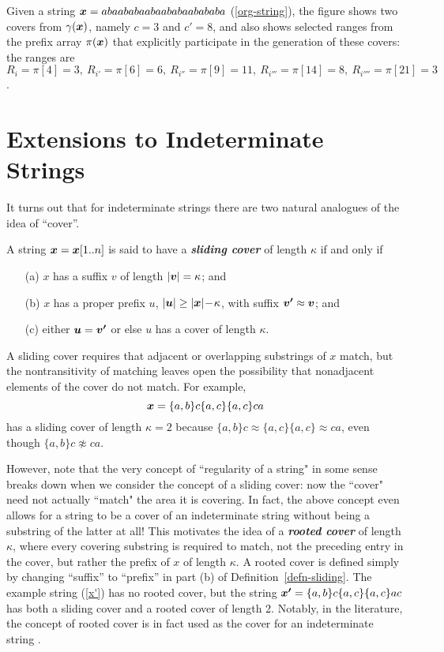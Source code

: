 \documentclass[runningheads,a4paper]{llncs}
\def\s#1{\mbox{\boldmath $#1$}}
\def\-{\!-\!}
\def\itbf#1{\textit{\textbf{#1}}}
\def\match{\approx}
\begin{document}
Given a string $\s{x}=abaababaabaababaabababa$ (\ref{org-string}),
the figure shows two covers from $\gamma(\s{x})$, namely $c=3$ and $c'=8$,
and also shows selected ranges from the prefix array $\pi(\s{x})$ that
explicitly participate in the generation of these covers: the ranges are $
R_{i} = \pi[4] = 3,~ R_{i'}= \pi[6] = 6,~ R_{i''} = \pi[9]=11,~ R_{i'''} =
\pi[14]=8,~ R_{i''''} = \pi[21] = 3$.
\section{Extensions to Indeterminate Strings}
\label{sect-indet}
It turns out that for indeterminate strings there are
two natural analogues of the idea of ``cover''.

\begin{definition}
\label{defn-sliding}
A string $\s{x} = \s{x}[1..n]$ is said to have a \itbf{sliding cover}
of length $\kappa$
if and only if
\begin{itemize}
\item[(a)]
\s{x} has a suffix \s{v} of length $|\s{v}|= \kappa$; and
\item[(b)]
\s{x} has a proper prefix \s{u}, $|\s{u}| \ge |\s{x}|\- \kappa$,
with suffix $\s{v'} \match \s{v}$; and
\item[(c)]
either $\s{u} = \s{v'}$ or else \s{u} has a cover of length $\kappa$.
\end{itemize}
\end{definition}

A sliding cover requires that adjacent or overlapping substrings of \s{x}
match, but the nontransitivity of matching leaves open the possibility
that nonadjacent elements of the cover do not match.
For example,
\begin{equation}
\label{x'}
\s{x} = \{a,b\}c\{a,c\}\{a,c\}ca
\end{equation}
has a sliding cover of length $\kappa = 2$ because $\{a,b\}c \match \{a,c\}\{a,c\} \match ca$,
even though $\{a,b\}c \not\match ca$.

However, note that the very concept of ``regularity of a string" in some
sense breaks down when we consider the concept of a sliding cover: now the
``cover" need not actually ``match" the area it is covering. In fact, the above
concept even allows for a string to be a cover of an indeterminate string
without being a substring of the latter at all! This motivates the idea of a
\itbf{rooted cover} of length $\kappa$, where every covering substring is
required to match, not the preceding entry in the cover, but rather the prefix
of \s{x} of length $\kappa$.
A rooted cover is defined simply by changing ``suffix'' to ``prefix''
in part (b) of Definition~\ref{defn-sliding}.
The example string (\ref{x'}) has no rooted cover,
but the string $\s{x'} = \{a,b\}c\{a,c\}\{a,c\}ac$
has both a sliding cover and a rooted cover of length 2. Notably, in the
literature, the concept of rooted cover is in fact used as the cover for an
indeterminate string \cite{BRS09}.
\end{document}
